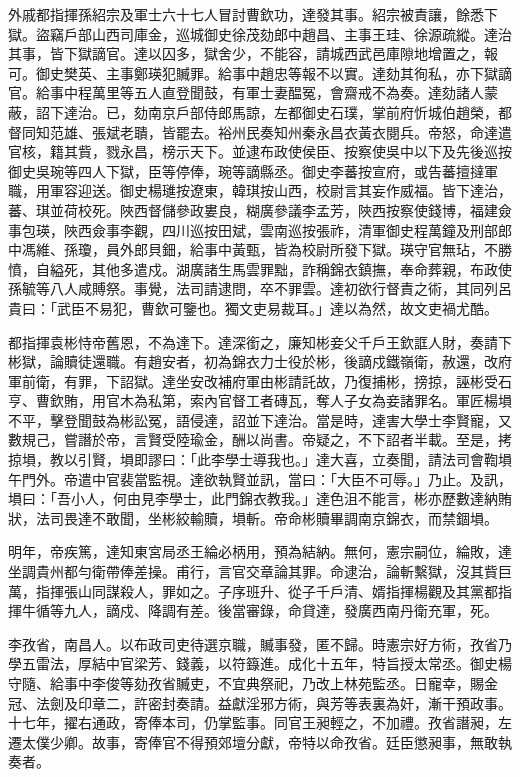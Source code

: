 \begin{pinyinscope}
外戚都指揮孫紹宗及軍士六十七人冒討曹欽功，達發其事。紹宗被責讓，餘悉下獄。盜竊戶部山西司庫金，巡城御史徐茂劾郎中趙昌、主事王珪、徐源疏縱。達治其事，皆下獄謫官。達以囚多，獄舍少，不能容，請城西武邑庫隙地增置之，報可。御史樊英、主事鄭瑛犯贓罪。給事中趙忠等報不以實。達劾其徇私，亦下獄謫官。給事中程萬里等五人直登聞鼓，有軍士妻醖冤，會齋戒不為奏。達劾諸人蒙蔽，詔下達治。已，劾南京戶部侍郎馬諒，左都御史石璞，掌前府忻城伯趙榮，都督同知范雄、張斌老聵，皆罷去。裕州民奏知州秦永昌衣黃衣閱兵。帝怒，命達遣官核，籍其貲，戮永昌，榜示天下。並逮布政使侯臣、按察使吳中以下及先後巡按御史吳琬等四人下獄，臣等停俸，琬等謫縣丞。御史李蕃按宣府，或告蕃擅撻軍職，用軍容迎送。御史楊璡按遼東，韓琪按山西，校尉言其妄作威福。皆下達治，蕃、琪並荷校死。陜西督儲參政婁良，糊廣參議李孟芳，陜西按察使錢博，福建僉事包瑛，陜西僉事李觀，四川巡按田斌，雲南巡按張祚，清軍御史程萬鐘及刑部郎中馮維、孫瓊，員外郎貝鈿，給事中黃甄，皆為校尉所發下獄。瑛守官無玷，不勝憤，自縊死，其他多遣戍。湖廣諸生馬雲罪黜，詐稱錦衣鎮撫，奉命葬親，布政使孫毓等八人咸賻祭。事覺，法司請逮問，卒不罪雲。達初欲行督責之術，其同列呂貴曰：「武臣不易犯，曹欽可鑒也。獨文吏易裁耳。」達以為然，故文吏禍尤酷。

都指揮袁彬恃帝舊恩，不為達下。達深銜之，廉知彬妾父千戶王欽誆人財，奏請下彬獄，論贖徒還職。有趙安者，初為錦衣力士役於彬，後謫戍鐵嶺衛，赦還，改府軍前衛，有罪，下詔獄。達坐安改補府軍由彬請託故，乃復捕彬，搒掠，誣彬受石亨、曹欽賄，用官木為私第，索內官督工者磚瓦，奪人子女為妾諸罪名。軍匠楊塤不平，擊登聞鼓為彬訟冤，語侵達，詔並下達治。當是時，達害大學士李賢寵，又數規己，嘗譖於帝，言賢受陸瑜金，酬以尚書。帝疑之，不下詔者半載。至是，拷掠塤，教以引賢，塤即謬曰：「此李學士導我也。」達大喜，立奏聞，請法司會鞫塤午門外。帝遣中官裴當監視。達欲執賢並訊，當曰：「大臣不可辱。」乃止。及訊，塤曰：「吾小人，何由見李學士，此門錦衣教我。」達色沮不能言，彬亦歷數達納賄狀，法司畏達不敢聞，坐彬絞輸贖，塤斬。帝命彬贖畢調南京錦衣，而禁錮塤。

明年，帝疾篤，達知東宮局丞王綸必柄用，預為結納。無何，憲宗嗣位，綸敗，達坐調貴州都勻衛帶俸差操。甫行，言官交章論其罪。命逮治，論斬繫獄，沒其貲巨萬，指揮張山同謀殺人，罪如之。子序班升、從子千戶清、婿指揮楊觀及其黨都指揮牛循等九人，謫戍、降調有差。後當審錄，命貸達，發廣西南丹衛充軍，死。

李孜省，南昌人。以布政司吏待選京職，贓事發，匿不歸。時憲宗好方術，孜省乃學五雷法，厚結中官梁芳、錢義，以符籙進。成化十五年，特旨授太常丞。御史楊守隨、給事中李俊等劾孜省贓吏，不宜典祭祀，乃改上林苑監丞。日寵幸，賜金冠、法劍及印章二，許密封奏請。益獻淫邪方術，與芳等表裏為奸，漸干預政事。十七年，擢右通政，寄俸本司，仍掌監事。同官王昶輕之，不加禮。孜省譖昶，左遷太僕少卿。故事，寄俸官不得預郊壇分獻，帝特以命孜省。廷臣懲昶事，無敢執奏者。


\end{pinyinscope}
